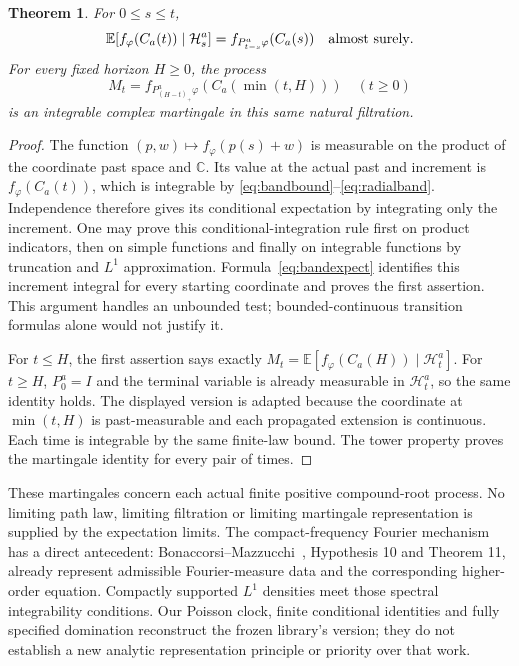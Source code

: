 \documentclass[11pt]{article}
\newtheorem{theorem}{Theorem}[section]
\newcommand{\C}{\mathbb C}\newcommand{\R}{\mathbb R}
\newcommand{\E}{\mathbb E}\newcommand{\Pp}{\mathbb P}
\begin{document}
\begin{theorem}\label{thm:bandconditional}
For $0\leq s\leq t$,
\[
 \E[f_\varphi(C_a(t))\mid\mathcal H_s^a]
 =f_{P_{t-s}^a\varphi}(C_a(s))\quad\hbox{almost surely}.
\]
For every fixed horizon $H\geq0$, the process
\[
 M_t=f_{P_{(H-t)_+}^a\varphi}(C_a(\min(t,H)))\quad(t\geq0)
\]
is an integrable complex martingale in this same natural filtration.
\end{theorem}
\begin{proof}
The function $(p,w)\mapsto f_\varphi(p(s)+w)$ is measurable on the
product of the coordinate past space and $\C$. Its value at the
actual past and increment is $f_\varphi(C_a(t))$, which is integrable
by \eqref{eq:bandbound}--\eqref{eq:radialband}. Independence therefore
gives its conditional expectation by integrating only the increment.
One may prove this conditional-integration rule first on product
indicators, then on simple functions and finally on integrable functions
by truncation and $L^1$ approximation. Formula~\eqref{eq:bandexpect}
identifies this increment integral for every starting coordinate and
proves the first assertion. This argument handles an unbounded test;
bounded-continuous transition formulas alone would not justify it.

For $t\leq H$, the first assertion says exactly
$M_t=\E[f_\varphi(C_a(H))\mid\mathcal H_t^a]$. For $t\geq H$,
$P_0^a=I$ and the terminal variable is already measurable in
$\mathcal H_t^a$, so the same identity holds. The displayed version is
adapted because the coordinate at $\min(t,H)$ is past-measurable and
each propagated extension is continuous. Each time is integrable by
the same finite-law bound. The tower property proves the martingale
identity for every pair of times.
\end{proof}

These martingales concern each actual finite positive compound-root
process. No limiting path law, limiting filtration or limiting
martingale representation is supplied by the expectation limits.
The compact-frequency Fourier mechanism has a direct antecedent:
Bonaccorsi--Mazzucchi~\cite{BM}, Hypothesis 10 and Theorem 11, already
represent admissible Fourier-measure data and the corresponding
higher-order equation. Compactly supported $L^1$ densities meet those
spectral integrability conditions. Our Poisson clock, finite conditional
identities and fully specified domination reconstruct the frozen
library's version; they do not establish a new analytic representation
principle or priority over that work.
\end{document}
